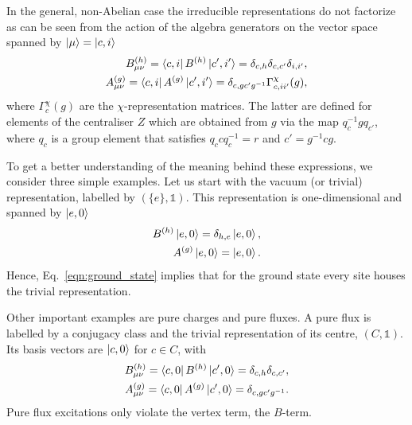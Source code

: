 \documentclass[two column]{article}
\newcommand{\caro}[1]{\textcolor{red}{[#1]}}
\begin{document}
In the general, non-Abelian case the irreducible representations do not factorize as can be seen from the action of the algebra generators on the vector space spanned by $\ket{\mu}=\ket{c,i}$ %
\begin{equation}
    \begin{split}
        B^{(h)}_{\mu\nu}=\bra{c, i} B^{(h)} \ket{c', i'} = \delta_{c, h} \delta_{c, c'}\delta_{i, i'}, \\
        A^{(g)}_{\mu\nu} = \bra{c, i} A^{(g)} \ket{c', i'} = \delta_{c,gc'g^{-1}} \Gamma^\chi_{c,ii'}(g),
    \end{split}
\end{equation}
where $\Gamma^\chi_c(g)$ are the $\chi$-representation matrices. The latter are defined for elements of the centraliser $Z$ which are obtained from $g$ via the map $q_{c}^{-1}gq_{c'}$, where $q_c$ is a group element that satisfies $q_c c q_c^{-1} = r$ and $c'=g^{-1}cg$. 


To get a better understanding of the meaning behind these expressions, we consider three simple examples. Let us start with the vacuum (or trivial) representation, labelled by $(\{e\}, \mathbb{1})$. This representation is one-dimensional and spanned by $\ket{e, 0}$
\begin{equation}
    \begin{split}
        B^{(h)}\ket{e, 0} = \delta_{h,e}\ket{e, 0},\\
        A^{(g)}\ket{e, 0} = \ket{e,0}.
    \end{split}
\end{equation}
Hence, Eq.~\eqref{eqn:ground_state} implies that for the ground state every site houses the trivial representation.

Other important examples are pure charges and pure fluxes. A pure flux is labelled by a conjugacy class and the trivial representation of its centre, $(C, \mathbb{1})$. Its basis vectors are $\ket{c, 0}$ for $c \in C$, with
\begin{equation}
    \begin{split}
        B^{(h)}_{\mu\nu}=\bra{c, 0} B^{(h)} \ket{c', 0} = \delta_{c, h} \delta_{c, c'}, \\
        A^{(g)}_{\mu\nu} = \bra{c, 0} A^{(g)} \ket{c', 0} = \delta_{c,gc'g^{-1}}.
    \end{split}
\end{equation}
Pure flux excitations only violate the vertex term, the $B$-term.
\end{document}
